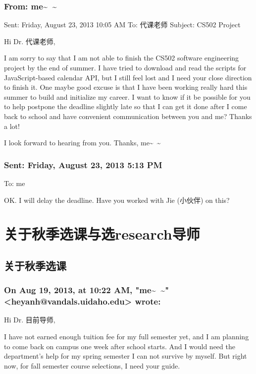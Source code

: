 \documentclass[12pt]{book}
\begin{document}
\subsection{From: me\textasciitilde{}~\textasciitilde{}}
\label{sec-7-2-5}
Sent: Friday, August 23, 2013 10:05 AM
To: 代课老师
Subject: CS502 Project

Hi Dr. 代课老师, 

I am sorry to say that I am not able to finish the CS502 software engineering project by the end of summer. I have tried to download and read the scripts for JavaScript-based calendar API, but I still feel lost and I need your close direction to finish it. One maybe good excuse is that I have been working really hard this summer to build and initialize my career. I want to know if it be possible for you to help postpone the deadline slightly late so that I can get it done after I come back to school and have convenient communication between you and me? Thanks a lot!

I look forward to hearing from you. 
Thanks,
me\textasciitilde{}~\textasciitilde{}

\subsection{Sent: Friday, August 23, 2013 5:13 PM}
\label{sec-7-2-6}
To: me

OK. I will delay the deadline. Have you worked with Jie (小伙伴) on this?


\chapter{关于秋季选课与选research导师}
\label{sec-8}
\section{关于秋季选课}
\label{sec-8-1}
\subsection{On Aug 19, 2013, at 10:22 AM, "me\textasciitilde{}~\textasciitilde{}" <heyanh@vandals.uidaho.edu> wrote:}
\label{sec-8-1-1}

Hi Dr. 目前导师, 

I have not earned enough tuition fee for my full semester yet, and I am planning to come back on campus one week after school starts. And I would need the department's help for my spring semester I can not survive by myself. But right now, for fall semester course selections, I need your guide. 
\end{document}
